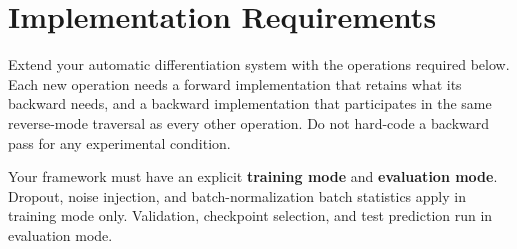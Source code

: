 \documentclass[11pt]{article}
\begin{document}



\section{Implementation Requirements}
Extend your automatic differentiation system with the operations required below. Each new operation needs a forward implementation that retains what its backward needs, and a backward implementation that participates in the same reverse-mode traversal as every other operation. Do not hard-code a backward pass for any experimental condition.

Your framework must have an explicit \textbf{training mode} and \textbf{evaluation mode}. Dropout, noise injection, and batch-normalization batch statistics apply in training mode only. Validation, checkpoint selection, and test prediction run in evaluation mode.
\end{document}
